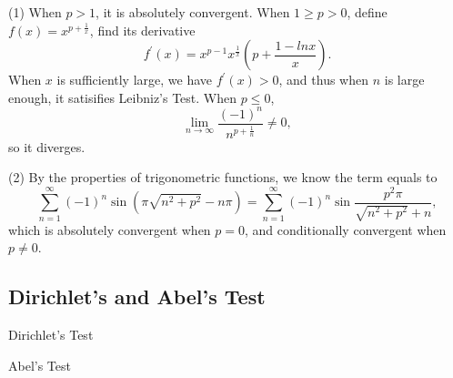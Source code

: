 \begin{solution}
  (1) When $p > 1$, it is absolutely convergent.
  When $1 \geq p > 0$, define $f(x) = x^{p + \frac{1}{x}}$,
  find its derivative
  \begin{equation}
    f^{\prime}(x) = x^{p-1}x^{\frac{1}{x}} \left( p + \frac{1 - ln x}{x} \right).
  \end{equation}
  When $x$ is sufficiently large, we have $f^{\prime}(x) > 0$,
  and thus when $n$ is large enough, it satisifies Leibniz's Test.
  When $p \leq 0$,
  \begin{equation}
    \lim \limits _{n \rightarrow \infty} \frac{(-1)^n}{n^{p + \frac{1}{n}}} \neq 0,
  \end{equation}
  so it diverges.

  (2) By the properties of trigonometric functions, we know
  the term equals to
  \begin{equation}
    \sum\limits_{n = 1}^{\infty} (-1)^n \sin (\pi \sqrt{n^2 + p^2} - n\pi)
    = \sum\limits_{n = 1}^{\infty}(-1)^n \sin \frac{p^2 \pi}{\sqrt{n^2 + p^2} + n},
  \end{equation}
  which is absolutely convergent when $p = 0$,
  and conditionally convergent when $p \neq 0$.
\end{solution}

\subsection{Dirichlet's and Abel's Test}

\begin{theorem}{Dirichlet's Test}{}
  
\end{theorem}

\begin{theorem}{Abel's Test}{}
  
\end{theorem}


